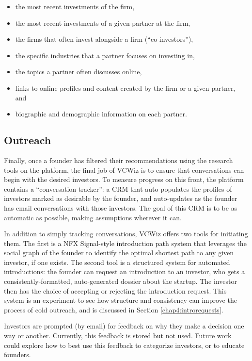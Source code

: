 \begin{itemize}
  \item the most recent investments of the firm,
  \item the most recent investments of a given partner at the firm,
  \item the firms that often invest alongside a firm (``co-investors''),
  \item the specific industries that a partner focuses on investing in,
  \item the topics a partner often discusses online,
  \item links to online profiles and content created by the firm or a given partner, and
  \item biographic and demographic information on each partner.
\end{itemize}

\subsection{Outreach}

Finally, once a founder has filtered their recommendations using the research tools on the platform, the final job of VCWiz is to ensure that conversations can begin with the desired investors. To measure progress on this front, the platform contains a ``conversation tracker'': a CRM that auto-populates the profiles of investors marked as desirable by the founder, and auto-updates as the founder has email conversations with those investors. The goal of this CRM is to be as automatic as possible, making assumptions wherever it can.

In addition to simply tracking conversations, VCWiz offers two tools for initiating them. The first is a NFX Signal-style introduction path system that leverages the social graph of the founder to identify the optimal shortest path to any given investor, if one exists. The second tool is a structured system for automated introductions: the founder can request an introduction to an investor, who gets a consistently-formatted, auto-generated dossier about the startup. The investor then has the choice of accepting or rejecting the introduction request. This system is an experiment to see how structure and consistency can improve the process of cold outreach, and is discussed in Section \ref{chap4:introrequests}.

Investors are prompted (by email) for feedback on why they make a decision one way or another. Currently, this feedback is stored but not used. Future work could explore how to best use this feedback to categorize investors, or to educate founders.

